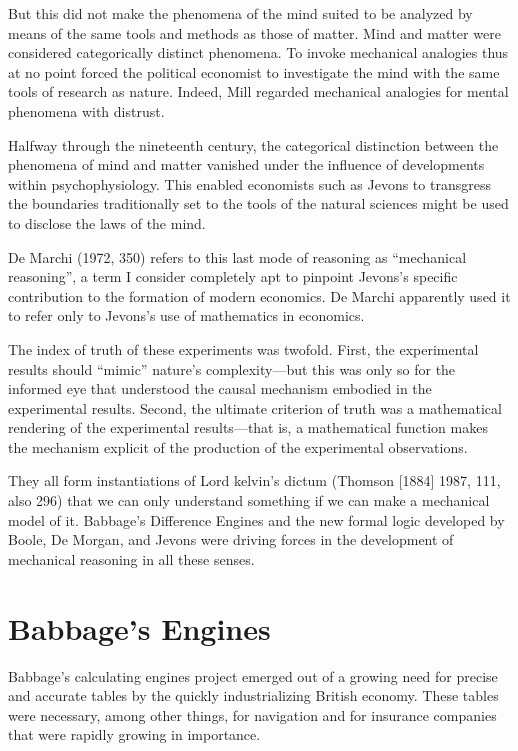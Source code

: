 \documentclass[version=last,draft=true,paper=A4,portrait,twoside=true,twocolumn=false,headinclude=false,footinclude=false,fontsize=12,BCOR=20mm,DIV=calc,pagesize=auto,titlepage=firstiscover,mpinclude=true,open=right,chapterprefix=true,numbers=autoendperiod,headsepline=false,headings=twolinechapter,parskip=false]{scrbook}
\begin{document}
But this did not make the phenomena of the mind suited to be analyzed by
means of the same tools and methods as those of matter. Mind and matter
were considered categorically distinct phenomena. To invoke mechanical
analogies thus at no point forced the political economist to investigate
the mind with the same tools of research as nature. Indeed, Mill regarded
mechanical analogies for mental phenomena with distrust. 

Halfway through the nineteenth century, the categorical distinction between
the phenomena of mind and matter vanished under the influence of
developments within psychophysiology. This enabled economists such as
Jevons to transgress the boundaries traditionally set to the tools of the
natural sciences might be used to disclose the laws of the mind.

De Marchi (1972, 350) refers to this last mode of reasoning as ``mechanical
reasoning'', a term I consider completely apt to pinpoint Jevons's specific
contribution to the formation of modern economics. De Marchi apparently
used it to refer only to Jevons's use of mathematics in economics. 




The index of truth of these experiments was twofold. First, the
experimental results should ``mimic'' nature's complexity---but this was
only so for the informed eye that understood the causal mechanism embodied
in the experimental results. Second, the ultimate criterion of truth was a
mathematical rendering of the experimental results---that is, a
mathematical function makes the mechanism explicit of the production of the
experimental observations.

They all form instantiations of Lord kelvin's dictum (Thomson [1884] 1987,
111, also 296) that we can only understand something if we can make a
mechanical model of it. Babbage's Difference Engines and the new formal
logic developed by Boole, De Morgan, and Jevons were driving forces in the
development of mechanical reasoning in all these senses. 

\section{Babbage's Engines}
\label{sec:org257559e}

Babbage's calculating engines project emerged out of a growing need for
precise and accurate tables by the quickly industrializing British economy.
These tables were necessary, among other things, for navigation and for
insurance companies that were rapidly growing in importance. 
\end{document}
